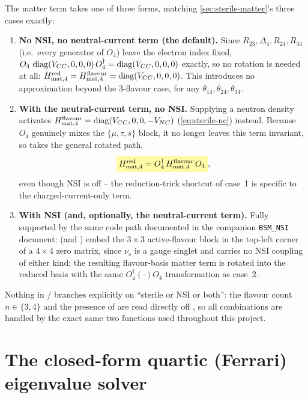 \begin{theorybox}
The matter term takes one of three forms, matching
\cref{sec:sterile-matter}'s three cases exactly:
\begin{enumerate}
  \item \textbf{No NSI, no neutral-current term (the default).} Since
    $R_{23},\Delta_4,R_{24},R_{34}$ (i.e.\ every generator of $O_4$) leave
    the electron index fixed, $O_4\,\operatorname{diag}(V_{CC},0,0,0)\,O_4^\dagger=\operatorname{diag}(V_{CC},0,0,0)$
    exactly, so no rotation is needed at all:
    $H_{\rm mat,4}^{\rm red}=H_{\rm mat,4}^{\rm flavour}=\operatorname{diag}(V_{CC},0,0,0)$.
    This introduces no approximation beyond the 3-flavour case, for any
    $\theta_{14},\theta_{24},\theta_{34}$.
  \item \textbf{With the neutral-current term, no NSI.} Supplying a
    neutron density activates $H_{\rm mat,4}^{\rm flavour}=\operatorname{diag}(V_{CC},0,0,-V_{NC})$
    (\cref{eq:sterile-nc}) instead. Because $O_4$ genuinely mixes the
    $\{\mu,\tau,s\}$ block, it no longer leaves this term invariant, so
     takes the general rotated path,
    \begin{equation}
      \keyresult{H_{\rm mat,4}^{\rm red}=O_4^\dagger\,H_{\rm mat,4}^{\rm flavour}\,O_4},
    \end{equation}
    even though NSI is off -- the reduction-trick shortcut of case~1 is
    specific to the charged-current-only term.
  \item \textbf{With NSI (and, optionally, the neutral-current term).}
    Fully supported by the same code path documented in the companion
    \texttt{BSM\_NSI} document: 
    (and ) embed the $3\times3$ active-flavour
    block in the top-left corner of a $4\times4$ zero matrix, since $\nu_s$
    is a gauge singlet and carries no NSI coupling of either kind; the
    resulting flavour-basis matter term is rotated into the reduced basis
    with the same $O_4^\dagger(\cdot)O_4$ transformation as case~2.
\end{enumerate}
Nothing in /
branches explicitly on ``sterile or NSI or both'': the flavour count
$n\in\{3,4\}$ and the presence of  are read directly
off , so all combinations are handled by the
exact same two functions used throughout this project.
\end{theorybox}

\section{The closed-form quartic (Ferrari) eigenvalue solver}
\label{sec:impl-ferrari}

